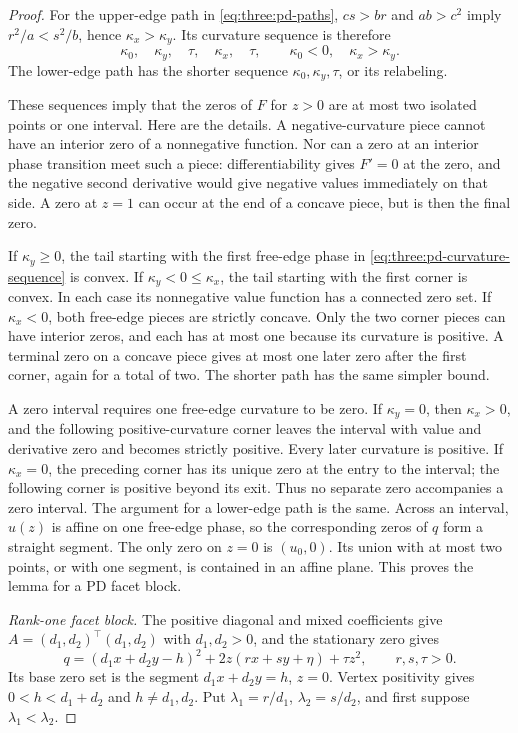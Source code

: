 \begin{proof}
For the upper-edge path in \eqref{eq:three:pd-paths},
$cs>br$ and $ab>c^2$ imply $r^2/a<s^2/b$, hence
$\kappa_x>\kappa_y$. Its curvature sequence is therefore
\begin{equation}\label{eq:three:pd-curvature-sequence}
 \kappa_0,\quad\kappa_y,\quad\tau,
       \quad\kappa_x,\quad\tau,
 \qquad \kappa_0<0,\quad\kappa_x>\kappa_y.
\end{equation}
The lower-edge path has the shorter sequence
$\kappa_0,\kappa_y,\tau$, or its relabeling.

These sequences imply that the zeros of $F$ for $z>0$ are at most two
isolated points or one interval. Here are the details. A negative-curvature
piece cannot have an interior zero of a nonnegative function. Nor can a
zero at an interior phase transition meet such a piece: differentiability
gives $F'=0$ at the zero, and the negative second derivative would give
negative values immediately on that side. A zero at $z=1$ can occur at
the end of a concave piece, but is then the final zero.

If $\kappa_y\ge0$, the tail starting with the first free-edge phase in
\eqref{eq:three:pd-curvature-sequence} is convex. If
$\kappa_y<0\le\kappa_x$, the tail starting with the first corner is
convex. In each case its nonnegative value function has a connected zero
set. If $\kappa_x<0$, both free-edge pieces are strictly concave. Only the
two corner pieces can have interior zeros, and each has at most one because
its curvature is positive. A terminal zero on a concave piece gives at
most one later zero after the first corner, again for a total of two.
The shorter path has the same simpler bound.

A zero interval requires one free-edge curvature to be zero. If
$\kappa_y=0$, then $\kappa_x>0$, and the following positive-curvature
corner leaves the interval with value and derivative zero and becomes
strictly positive. Every later curvature is positive. If $\kappa_x=0$,
the preceding corner has its unique zero at the entry to the interval;
the following corner is positive beyond its exit. Thus no separate zero
accompanies a zero interval. The argument for a lower-edge path is the
same. Across an interval, $u(z)$ is affine on one free-edge phase, so the
corresponding zeros of $q$ form a straight segment. The only zero on
$z=0$ is $(u_0,0)$. Its union with at most two points, or with one segment,
is contained in an affine plane. This proves the lemma for a PD facet
block.

\smallskip\noindent
\emph{Rank-one facet block.}
The positive diagonal and mixed coefficients give
$A=(d_1,d_2)^\top(d_1,d_2)$ with $d_1,d_2>0$, and the stationary zero
gives
\begin{equation}\label{eq:three:rankone-facet-form}
 q=(d_1x+d_2y-h)^2+2z(rx+sy+\eta)+\tau z^2,
 \qquad r,s,\tau>0.
\end{equation}
Its base zero set is the segment $d_1x+d_2y=h$, $z=0$.
Vertex positivity gives $0<h<d_1+d_2$ and $h\ne d_1,d_2$.
Put $\lambda_1=r/d_1$, $\lambda_2=s/d_2$, and first suppose
$\lambda_1<\lambda_2$.


\end{proof}

